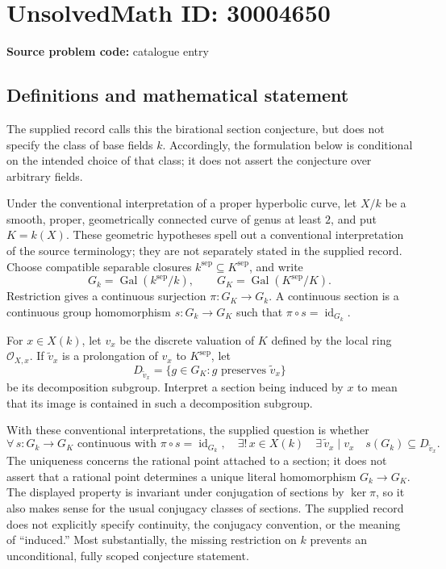 \documentclass[11pt]{article}
\begin{document}
\section*{UnsolvedMath ID: 30004650}
\textbf{Source problem code:} catalogue entry
\subsection{Definitions and mathematical statement}
The supplied record calls this the birational section conjecture, but does not specify the class of base fields \(k\). Accordingly, the formulation below is conditional on the intended choice of that class; it does not assert the conjecture over arbitrary fields.

Under the conventional interpretation of a proper hyperbolic curve, let \(X/k\) be a smooth, proper, geometrically connected curve of genus at least \(2\), and put \(K=k(X)\). These geometric hypotheses spell out a conventional interpretation of the source terminology; they are not separately stated in the supplied record. Choose compatible separable closures \(k^{\mathrm{sep}}\subseteq K^{\mathrm{sep}}\), and write
\[
G_k=\operatorname{Gal}(k^{\mathrm{sep}}/k),\qquad G_K=\operatorname{Gal}(K^{\mathrm{sep}}/K).
\]
Restriction gives a continuous surjection \(\pi:G_K\to G_k\). A continuous section is a continuous group homomorphism \(s:G_k\to G_K\) such that \(\pi\circ s=\operatorname{id}_{G_k}\).

For \(x\in X(k)\), let \(v_x\) be the discrete valuation of \(K\) defined by the local ring \(\mathcal O_{X,x}\). If \(\widetilde v_x\) is a prolongation of \(v_x\) to \(K^{\mathrm{sep}}\), let
\[
D_{\widetilde v_x}=\{g\in G_K:g\text{ preserves }\widetilde v_x\}
\]
be its decomposition subgroup. Interpret a section being induced by \(x\) to mean that its image is contained in such a decomposition subgroup.

With these conventional interpretations, the supplied question is whether
\[
\forall\,s:G_k\to G_K\text{ continuous with }\pi\circ s=\operatorname{id}_{G_k},\quad
\exists!\,x\in X(k)\quad
\exists\,\widetilde v_x\mid v_x\quad
s(G_k)\subseteq D_{\widetilde v_x}.
\]
The uniqueness concerns the rational point attached to a section; it does not assert that a rational point determines a unique literal homomorphism \(G_k\to G_K\). The displayed property is invariant under conjugation of sections by \(\ker\pi\), so it also makes sense for the usual conjugacy classes of sections. The supplied record does not explicitly specify continuity, the conjugacy convention, or the meaning of ``induced.'' Most substantially, the missing restriction on \(k\) prevents an unconditional, fully scoped conjecture statement.
\end{document}
